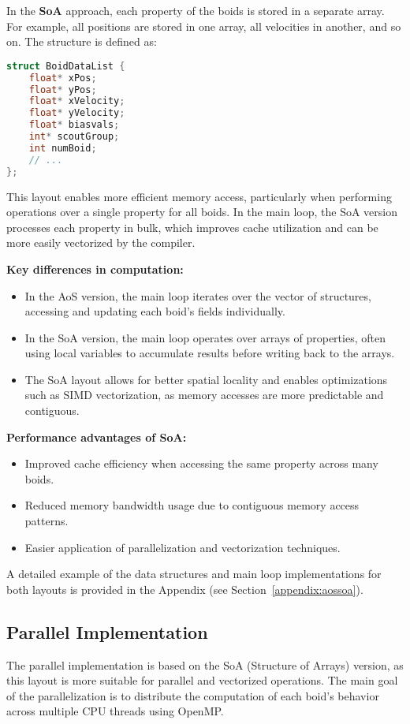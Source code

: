 \documentclass[10pt,twocolumn,letterpaper]{article}
\begin{document}
In the \textbf{SoA} approach, each property of the boids is stored in a separate array. For example, all positions are stored in one array, all velocities in another, and so on. The structure is defined as:
\begin{lstlisting}[language=C++]
struct BoidDataList {
    float* xPos;
    float* yPos;
    float* xVelocity;
    float* yVelocity;
    float* biasvals;
    int* scoutGroup;
    int numBoid;
    // ...
};
\end{lstlisting}
This layout enables more efficient memory access, particularly when performing operations over a single property for all boids. In the main loop, the SoA version processes each property in bulk, which improves cache utilization and can be more easily vectorized by the compiler.

\textbf{Key differences in computation:}
\begin{itemize}
    \item In the AoS version, the main loop iterates over the vector of structures, accessing and updating each boid's fields individually.
    \item In the SoA version, the main loop operates over arrays of properties, often using local variables to accumulate results before writing back to the arrays.
    \item The SoA layout allows for better spatial locality and enables optimizations such as SIMD vectorization, as memory accesses are more predictable and contiguous.
\end{itemize}

\textbf{Performance advantages of SoA:}
\begin{itemize}
    \item Improved cache efficiency when accessing the same property across many boids.
    \item Reduced memory bandwidth usage due to contiguous memory access patterns.
    \item Easier application of parallelization and vectorization techniques.
\end{itemize}

A detailed example of the data structures and main loop implementations for both layouts is provided in the Appendix (see Section~\ref{appendix:aossoa}).

\subsection{Parallel Implementation}
The parallel implementation is based on the SoA (Structure of Arrays) version, as this layout is more suitable for parallel and vectorized operations. The main goal of the parallelization is to distribute the computation of each boid's behavior across multiple CPU threads using OpenMP.
\end{document}
